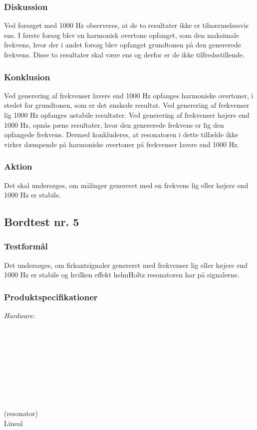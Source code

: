 			  
			\subsubsection{Diskussion}
			Ved forsøget med 1000 Hz observeres, at de to resultater ikke er tilnærmelsesvis ens. I første forsøg blev en harmonisk overtone opfanget, som den maksimale frekvens, hvor der i andet forsøg blev opfanget grundtonen på den genererede frekvens. Disse to resultater skal være ens og derfor er de ikke tilfredsstillende.
			
			\subsubsection{Konklusion}
			Ved generering af frekvenser lavere end 1000 Hz opfanges harmoniske overtoner, i stedet for grundtonen, som er det ønskede resultat. 
			Ved generering af frekvenser lig 1000 Hz opfanges ustabile resultater. 
			Ved generering af frekvenser højere end 1000 Hz, opnås pæne resultater, hvor den genererede frekvens er lig den opfangede frekvens.  
			Dermed konkluderes, at resonatoren i dette tilfælde ikke virker dæmpende på harmoniske overtoner på frekvenser lavere end 1000 Hz. 
			  
			\subsubsection{Aktion}
			Det skal undersøges, om målinger genereret med en frekvens lig eller højere end 1000 Hz er stabile. 
			
			\subsection{Bordtest nr. 5} %
		\subsubsection{Testformål}
		Det undersøges, om firkantsignaler genereret med frekvenser lig eller højere end 1000 Hz er stabile og hvilken effekt helmHoltz resonatoren har på signalerne. 
		
		\subsubsection{Produktspecifikationer}
		
		\textit{Hardware:}\\
		\tores\\
		\hojtalerkabel\\
		\kabelsko\\
		\pins\\
		\krympeflex\\
		\arduino\\
		\mikrofon\\
		\PC\\
		\usbkabel\\
		 (resonator)\\
		Lineal\\
	
